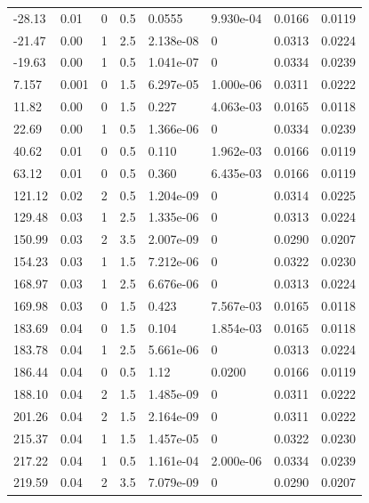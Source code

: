 \documentclass[preview]{standalone}
\begin{document}
{{\begin{tabular}{L{1.2cm}C{1.2cm} C{0.3cm}C{0.5cm} C{1.4cm}C{1.4cm} C{1.4cm}C{1.4cm}}
  -28.13  &  0.01  & 0     & 0.5 &  0.0555  & 9.930e-04  & 0.0166 &  0.0119   \\ 
  -21.47  &  0.00  & 1     & 2.5 &  2.138e-08  & 0  & 0.0313 &  0.0224   \\ 
  -19.63  &  0.00  & 1     & 0.5 &  1.041e-07  & 0  & 0.0334 &  0.0239   \\ 
  7.157  &  0.001  & 0     & 1.5 &  6.297e-05  & 1.000e-06  & 0.0311 &  0.0222   \\ 
  11.82  &  0.00  & 0     & 1.5 &  0.227  & 4.063e-03  & 0.0165 &  0.0118   \\ 
  22.69  &  0.00  & 1     & 0.5 &  1.366e-06  & 0  & 0.0334 &  0.0239   \\ 
  40.62  &  0.01  & 0     & 0.5 &  0.110  & 1.962e-03  & 0.0166 &  0.0119   \\ 
  63.12  &  0.01  & 0     & 0.5 &  0.360  & 6.435e-03  & 0.0166 &  0.0119   \\ 
  121.12  &  0.02  & 2     & 0.5 &  1.204e-09  & 0  & 0.0314 &  0.0225   \\ 
  129.48  &  0.03  & 1     & 2.5 &  1.335e-06  & 0  & 0.0313 &  0.0224   \\ 
  150.99  &  0.03  & 2     & 3.5 &  2.007e-09  & 0  & 0.0290 &  0.0207   \\ 
  154.23  &  0.03  & 1     & 1.5 &  7.212e-06  & 0  & 0.0322 &  0.0230   \\ 
  168.97  &  0.03  & 1     & 2.5 &  6.676e-06  & 0  & 0.0313 &  0.0224   \\ 
  169.98  &  0.03  & 0     & 1.5 &  0.423  & 7.567e-03  & 0.0165 &  0.0118   \\ 
  183.69  &  0.04  & 0     & 1.5 &  0.104  & 1.854e-03  & 0.0165 &  0.0118   \\ 
  183.78  &  0.04  & 1     & 2.5 &  5.661e-06  & 0  & 0.0313 &  0.0224   \\ 
  186.44  &  0.04  & 0     & 0.5 &  1.12  & 0.0200  & 0.0166 &  0.0119   \\ 
  188.10  &  0.04  & 2     & 1.5 &  1.485e-09  & 0  & 0.0311 &  0.0222   \\ 
  201.26  &  0.04  & 2     & 1.5 &  2.164e-09  & 0  & 0.0311 &  0.0222   \\ 
  215.37  &  0.04  & 1     & 1.5 &  1.457e-05  & 0  & 0.0322 &  0.0230   \\ 
  217.22  &  0.04  & 1     & 0.5 &  1.161e-04  & 2.000e-06  & 0.0334 &  0.0239   \\ 
  219.59  &  0.04  & 2     & 3.5 &  7.079e-09  & 0  & 0.0290 &  0.0207   \\ 

\end{tabular}}}
\end{document}
